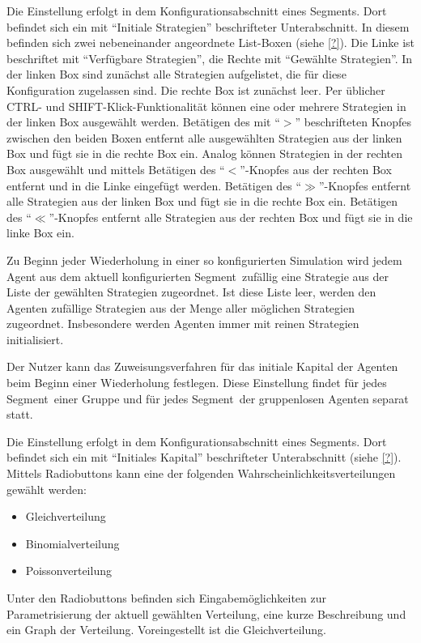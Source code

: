 \documentclass[parskip=full,11pt]{scrartcl}
\def\segment{Segment}
\begin{document}
Die Einstellung erfolgt in dem Konfigurationsabschnitt eines \segment s. Dort befindet sich ein mit \enquote{Initiale Strategien} beschrifteter Unterabschnitt. In diesem befinden sich zwei nebeneinander angeordnete List-Boxen (siehe \cref{?}). Die Linke ist beschriftet mit \enquote{Verfügbare Strategien}, die Rechte mit \enquote{Gewählte Strategien}. In der linken Box sind zunächst alle Strategien aufgelistet, die für diese Konfiguration zugelassen sind. Die rechte Box ist zunächst leer. Per üblicher \textsf{CTRL}- und \textsf{SHIFT}-Klick-Funktionalität können eine oder mehrere Strategien in der linken Box ausgewählt werden. Betätigen des mit \enquote{\(>\)} beschrifteten Knopfes zwischen den beiden Boxen entfernt alle ausgewählten Strategien aus der linken Box und fügt sie in die rechte Box ein. Analog können Strategien in der rechten Box ausgewählt und mittels Betätigen des \enquote{\(<\)}-Knopfes aus der rechten Box entfernt und in die Linke eingefügt werden. Betätigen des \enquote{\(\gg\)}-Knopfes entfernt alle Strategien aus der linken Box und fügt sie in die rechte Box ein. Betätigen des \enquote{\(\ll\)}-Knopfes entfernt alle Strategien aus der rechten Box und fügt sie in die linke Box ein.

Zu Beginn jeder Wiederholung in einer so konfigurierten Simulation wird jedem Agent aus dem aktuell konfigurierten \segment\ zufällig eine Strategie aus der Liste der gewählten Strategien zugeordnet. Ist diese Liste leer, werden den Agenten zufällige Strategien aus der Menge aller möglichen Strategien zugeordnet. Insbesondere werden Agenten immer mit reinen Strategien initialisiert.

Der Nutzer kann das Zuweisungsverfahren für das initiale Kapital der Agenten beim Beginn einer Wiederholung festlegen. Diese Einstellung findet für jedes \segment\ einer Gruppe und für jedes \segment\ der gruppenlosen Agenten separat statt.

Die Einstellung erfolgt in dem Konfigurationsabschnitt eines \segment s. Dort befindet sich ein mit \enquote{Initiales Kapital} beschrifteter Unterabschnitt (siehe \cref{?}). Mittels Radiobuttons kann eine der folgenden Wahrscheinlichkeitsverteilungen gewählt werden:
\begin{itemize}
\item Gleichverteilung
\item Binomialverteilung
\item Poissonverteilung
\end{itemize}
Unter den Radiobuttons befinden sich Eingabemöglichkeiten zur Parametrisierung der aktuell gewählten Verteilung, eine kurze Beschreibung und ein Graph der Verteilung. Voreingestellt ist die Gleichverteilung.
\end{document}
